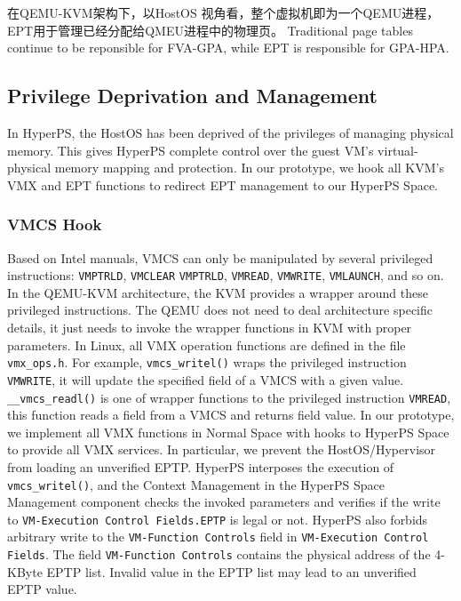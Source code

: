 在QEMU-KVM架构下，以HostOS 视角看，整个虚拟机即为一个QEMU进程，EPT用于管理已经分配给QMEU进程中的物理页。
Traditional page tables continue to be reponsible for FVA-GPA, while EPT is responsible for GPA-HPA.
\fi

\subsection{Privilege Deprivation and Management}%
\label{sub:privilege_deprivation_and_management}


In HyperPS, the HostOS has been deprived of the privileges of managing physical memory. This gives HyperPS complete control over the guest VM's virtual-physical memory mapping and protection. In our prototype, we hook all KVM's VMX and EPT functions to redirect EPT management to our HyperPS Space.

\subsubsection{VMCS Hook}%
\label{ssub:vmcs_hook}


Based on Intel manuals, VMCS can only be manipulated by several privileged instructions: \verb|VMPTRLD|, \verb|VMCLEAR| \verb|VMPTRLD|, \verb|VMREAD|, \verb|VMWRITE|, \verb|VMLAUNCH|, and so on.
In the QEMU-KVM architecture, the KVM provides a wrapper around these privileged instructions. The QEMU does not need to deal architecture specific details, it just needs to invoke the wrapper functions in KVM with proper parameters.
In Linux, all VMX operation functions are defined in the file \verb|vmx_ops.h|. 
For example, \verb|vmcs_writel()| wraps the privileged instruction \verb|VMWRITE|, it will update the specified field of a VMCS with a given value. 
\verb|__vmcs_readl()| is one of wrapper functions to the privileged instruction \verb|VMREAD|, this function reads a field from a VMCS and returns field value. 
In our prototype, we implement all VMX functions in Normal Space with hooks to HyperPS Space to provide all VMX services. 
In particular, we prevent the HostOS/Hypervisor from loading an unverified EPTP. 
HyperPS interposes the execution of \verb|vmcs_writel()|, and the Context Management in the HyperPS Space Management component checks the invoked parameters and verifies if the write to \verb|VM-Execution Control Fields.EPTP| is legal or not. 
HyperPS also forbids arbitrary write to the \verb|VM-Function Controls| field in \verb|VM-Execution Control Fields|.
The field \verb|VM-Function Controls| contains the physical address of the 4-KByte EPTP list. Invalid value in the EPTP list may lead to an unverified EPTP value. 

